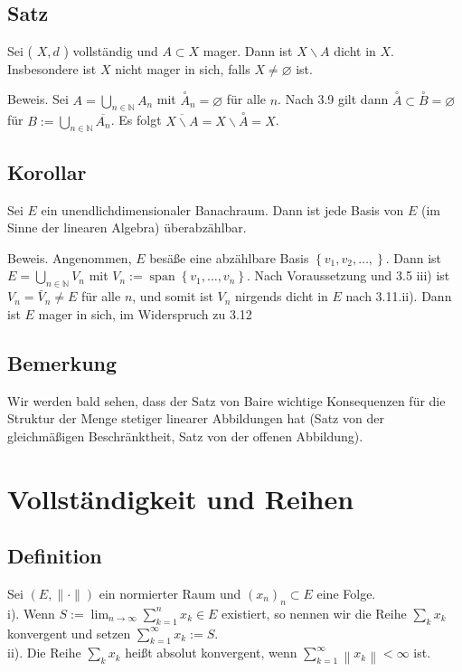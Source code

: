 \documentclass[10pt, letterpaper]{article}
\begin{document}
\subsection*{Satz}
Sei ( $X, d$ ) vollständig und $A \subset X$ mager. Dann ist $X \backslash A$ dicht in $X$. Insbesondere ist $X$ nicht mager in sich, falls $X \neq \varnothing$ ist.

Beweis. Sei $A=\bigcup_{n \in \mathbb{N}} A_{n}$ mit $\stackrel{\circ}{A}_{n}=\varnothing$ für alle $n$. Nach 3.9 gilt dann $\stackrel{\circ}{A} \subset \stackrel{\circ}{B}=\varnothing$ für $B:=\bigcup_{n \in \mathbb{N}} \overline{A_{n}}$. Es folgt $\overline{X \backslash A}=X \backslash \stackrel{\circ}{A}=X$.

\subsection*{Korollar}
Sei $E$ ein unendlichdimensionaler Banachraum. Dann ist jede Basis von $E$ (im Sinne der linearen Algebra) überabzählbar.

Beweis. Angenommen, $E$ besäße eine abzählbare Basis $\left\{v_{1}, v_{2}, \ldots,\right\}$. Dann ist $E= \bigcup_{n \in \mathbb{N}} V_{n}$ mit $V_{n}:=\operatorname{span}\left\{v_{1}, \ldots, v_{n}\right\}$. Nach Voraussetzung und 3.5 iii) ist $V_{n}=\bar{V}_{n} \neq E$ für alle $n$, und somit ist $V_{n}$ nirgends dicht in $E$ nach 3.11.ii). Dann ist $E$ mager in sich, im Widerspruch zu 3.12

\subsection*{Bemerkung}
Wir werden bald sehen, dass der Satz von Baire wichtige Konsequenzen für die Struktur der Menge stetiger linearer Abbildungen hat (Satz von der gleichmäßigen Beschränktheit, Satz von der offenen Abbildung).

\section*{Vollständigkeit und Reihen}
\subsection*{Definition}
Sei $(E,\|\cdot\|)$ ein normierter Raum und $\left(x_{n}\right)_{n} \subset E$ eine Folge.\\
i). Wenn $S:=\lim _{n \rightarrow \infty} \sum_{k=1}^{n} x_{k} \in E$ existiert, so nennen wir die Reihe $\sum_{k} x_{k}$ konvergent und setzen $\sum_{k=1}^{\infty} x_{k}:=S$.\\
ii). Die Reihe $\sum_{k} x_{k}$ heißt absolut konvergent, wenn $\sum_{k=1}^{\infty}\left\|x_{k}\right\|<\infty$ ist.
\end{document}
